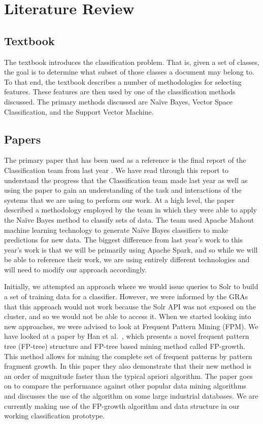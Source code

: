 \chapter{Literature Review}\label{ch:literatureReview}

\section{Textbook}
The textbook \cite{manning2008introduction} introduces the classification problem. That is, given a set of classes, the goal is to determine what subset of those classes a document may belong to. To that end, the textbook describes a number of methodologies for selecting features. These features are then used by one of the classification methods discussed. The primary methods discussed are Na\"{i}ve Bayes, Vector Space Classification, and the Support Vector Machine.

\section{Papers}
The primary paper that has been used as a reference is the final report of the Classification team from last year \cite{cui2015classification}. We have read through this report to understand the progress that the Classification team made last year as well as using the paper to gain an understanding of the task and interactions of the systems that we are using to perform our work. At a high level, the paper described a methodology employed by the team in which they were able to apply the Na{\"i}ve Bayes method to classify sets of data. The team used Apache Mahout machine learning technology to generate Na{\"i}ve Bayes classifiers to make predictions for new data. The biggest difference from last year's work to this year's work is that we will be primarily using Apache Spark, and so while we will be able to reference their work, we are using entirely different technologies and will need to modify our approach accordingly.

Initially, we attempted an approach where we would issue queries to Solr to build a set of training data for a classifier. However, we were informed by the GRAs that this approach would not work because the Solr API was not exposed on the cluster, and so we would not be able to access it. When we started looking into new approaches, we were advised to look at Frequent Pattern Mining (FPM). We have looked at a paper by Han et al.\ \cite{han2000mining}, which presents a novel frequent pattern tree (FP-tree) structure and FP-tree based mining method called FP-growth. This method allows for mining the complete set of frequent patterns by pattern fragment growth. In this paper they also demonstrate that their new method is an order of magnitude faster than the typical apriori algorithm. The paper goes on to compare the performance against other popular data mining algorithms and discusses the use of the algorithm on some large industrial databases. We are currently making use of the FP-growth algorithm and data structure in our working classification prototype.